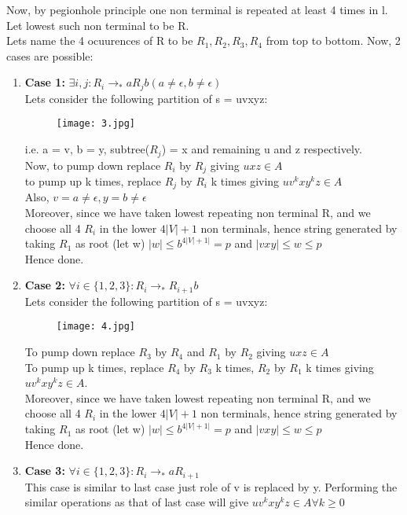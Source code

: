 \documentclass{article}
\begin{document}
Now, by pegionhole principle one non terminal is repeated at least 4 times in l. Let lowest such non terminal to be R.\\
Lets name the 4 ocuurences of R to be $R_1, R_2, R_3, R_4$ from top to bottom.
Now, 2 cases are possible:\\


\begin{enumerate}
    \item \textbf{Case 1: } $\exists i,j : R_i \rightarrow_* aR_jb (a \neq \epsilon, b \neq \epsilon)$ \\ 
    Lets consider the following partition of s = uvxyz:

    \begin{figure}[H]
        \centering
        \texttt{[image: 3.jpg]}
    \end{figure}

    i.e. a = v, b = y, subtree($R_j$) = x and remaining u and z respectively.\\
    Now, to pump down replace $R_i$ by $R_j$ giving $uxz \in A$\\
    to pump up k times, replace $R_j $ by $R_i$ k times giving $uv^kxy^kz \in A$\\
    Also, $v=a \neq \epsilon, y=b \neq \epsilon$ \\
    Moreover, since we have taken lowest repeating non terminal R, and we choose all 4 $R_i$ in the lower $4|V| + 1$ non terminals, hence string generated by 
    taking $R_1$ as root (let w) $|w| \leq b^{4|V| + 1|} = p$ and $|vxy| \leq w \leq p$\\  
    Hence done. 
    
    \item \textbf{Case 2: }$\forall i \in \{1,2,3\} : R_i \rightarrow_* R_{i+1}b$\\
    Lets consider the following partition of s = uvxyz:
    \begin{figure}[H]
        \centering
        \texttt{[image: 4.jpg]}
    \end{figure}
    To pump down replace $R_3 $ by $R_4$ and $R_1$ by $R_2$ giving $uxz \in A$\\
    To pump up k times, replace $R_4$ by $R_3$ k times, $R_2$ by $R_1$ k times giving $uv^kxy^kz \in A$.\\
    Moreover, since we have taken lowest repeating non terminal R, and we choose all 4 $R_i$ in the lower $4|V| + 1$ non terminals, hence string generated by 
    taking $R_1$ as root (let w) $|w| \leq b^{4|V| + 1|} = p$ and $|vxy| \leq w \leq p$\\  
    Hence done. 

    \item \textbf{Case 3: }$\forall i \in \{1,2,3\} : R_i \rightarrow_* aR_{i+1}$\\
    This case is similar to last case just role of v is replaced by y. Performing the similar operations as that of  
    last case will give $uv^kxy^kz \in A \forall k \geq 0$\\
\end{enumerate}
\end{document}
